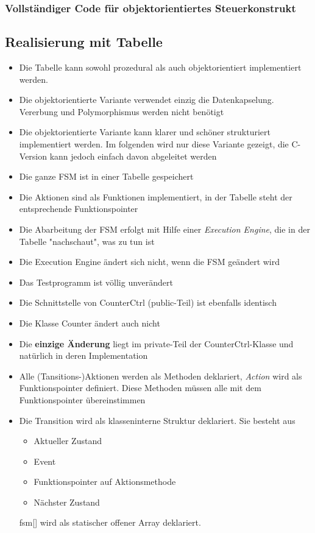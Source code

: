 \subsubsection{Vollständiger Code für objektorientiertes Steuerkonstrukt}



\subsection{Realisierung mit Tabelle}
\begin{itemize}
  \item Die Tabelle kann sowohl prozedural als auch objektorientiert implementiert werden.
  \item Die objektorientierte Variante verwendet einzig die Datenkapselung. Vererbung und Polymorphismus werden nicht benötigt
  \item Die objektorientierte Variante kann klarer und schöner strukturiert implementiert werden. Im folgenden wird nur diese Variante gezeigt, die C-Version kann jedoch einfach davon abgeleitet werden
  \item Die ganze FSM ist in einer Tabelle gespeichert
  \item Die Aktionen sind als Funktionen implementiert, in der Tabelle steht der entsprechende Funktionspointer
  \item Die Abarbeitung der FSM erfolgt mit Hilfe einer \textit{Execution Engine}, die in der Tabelle "nachschaut", was zu tun ist
  \item Die Execution Engine ändert sich nicht, wenn die FSM geändert wird
  \item Das Testprogramm ist völlig unverändert
  \item Die Schnittstelle von CounterCtrl (public-Teil) ist ebenfalls identisch
  \item Die Klasse Counter ändert auch nicht
  \item Die \textbf{einzige Änderung} liegt im private-Teil der
        CounterCtrl-Klasse und natürlich in deren Implementation
  \item Alle (Tansitions-)Aktionen werden als Methoden deklariert,
  \textit{Action} wird als Funktionspointer definiert. Diese Methoden müssen
  alle mit dem Funktionspointer übereinstimmen
  

 \item Die Transition wird als klasseninterne Struktur deklariert. Sie besteht
 aus
 \begin{itemize}
   \item Aktueller Zustand
   \item Event
   \item Funktionspointer auf Aktionsmethode
   \item Nächster Zustand
 \end{itemize}
fsm[] wird als statischer offener Array deklariert.



\end{itemize}
